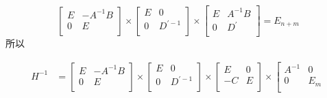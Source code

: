 \documentclass{article}
\begin{document}
\begin{spacing}{1.5}
\begin{enumerate}
    \begin{equation*}
        \left[
            \begin{array}{cc}
                E & -A^{-1}B \\
                0 & E \\
            \end{array}
        \right]
        \times
        \left[
            \begin{array}{cc}
                E & 0 \\
                0 & D^{\prime-1} \\
            \end{array}
        \right] 
        \times 
        \left[
            \begin{array}{cc}
                E & A^{-1}B \\
                0 & D^\prime \\
            \end{array}
        \right]
        = E_{n+m}
    \end{equation*}
    所以 
    \begin{spacing}{1.5}
    \begin{equation*}
        \begin{array}{ll}
            H^{-1} & = 
            \left[
                \begin{array}{cc}
                    E & -A^{-1}B \\
                    0 & E \\
                \end{array}
            \right]
            \times
            \left[
                \begin{array}{cc}
                    E & 0 \\
                    0 & D^{\prime-1} \\
                \end{array}
            \right] 
            \times
            \left[
                \begin{array}{cc}
                    E & 0 \\
                    -C & E \\
                \end{array}
            \right]
            \times
            \left[
                \begin{array}{cc}
                    A^{-1} & 0 \\
                    0 & E_m \\
                \end{array}

\end{array}
\end{equation*}
\end{spacing}
\end{enumerate}
\end{spacing}
\end{document}
